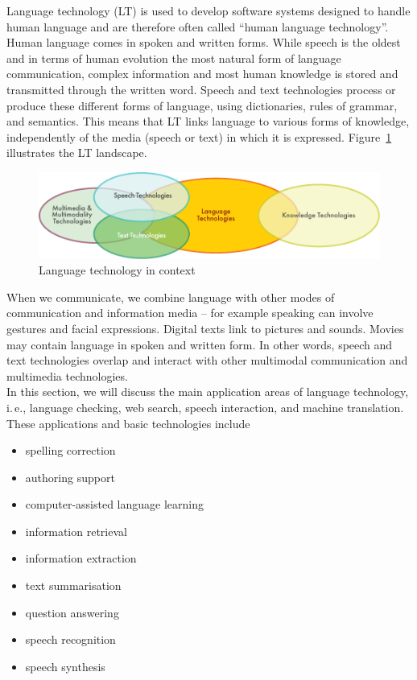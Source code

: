 \begin{multicols}{2}

Language technology (LT) is used to develop software systems designed to handle human language and are therefore often called “human language technology”. Human language comes in spoken and written forms. While speech is the oldest and in terms of human evolution the most natural form of language communication, complex information and most human knowledge is stored and transmitted through the written word. Speech and text technologies process or produce these different forms of language, using dictionaries, rules of grammar, and semantics. This means that LT links language to various forms of knowledge, independently of the media (speech or text) in which it is expressed. Figure~\ref{fig:ltincontext_en} illustrates the LT landscape.

\begin{figure}[htb]
  \center
  \includegraphics[width=\textwidth]{../_media/english/language_technologies}
  \caption{Language technology in context}
  \label{fig:ltincontext_en}
\end{figure}

When we communicate, we combine language with other modes of communication and information media – for example speaking can involve gestures and facial expressions. Digital texts link to pictures and sounds. Movies may contain language in spoken and written form. In other words, speech and text technologies overlap and interact with other multimodal communication and multimedia technologies.\\ 

In this section, we will discuss the main application areas of language technology, i.\,e., language checking, web search, speech interaction, and machine translation. These applications and basic technologies include 

\begin{itemize}
\item spelling correction
\item authoring support
\item computer-assisted language learning
\item information retrieval 
\item information extraction
\item text summarisation
\item question answering
\item speech recognition 
\item speech synthesis 
\end{itemize}


\end{multicols}
